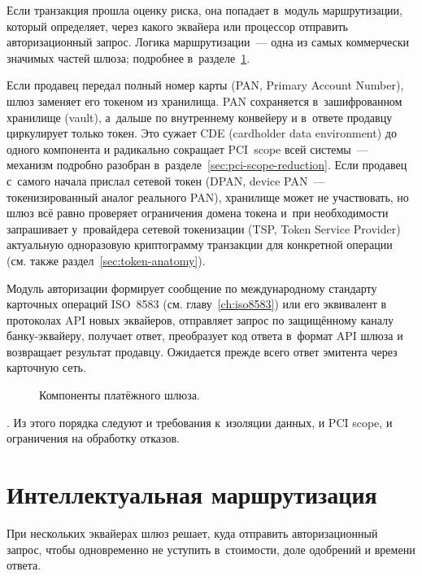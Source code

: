 Если транзакция прошла оценку риска, она попадает в~модуль
маршрутизации, который определяет, через какого эквайера
или процессор отправить авторизационный запрос.
Логика маршрутизации~--- одна из самых коммерчески
значимых частей шлюза; подробнее в~разделе~\ref{sec:gw-routing}.

Если продавец передал полный номер карты (PAN, Primary Account Number),
шлюз заменяет его токеном из хранилища. PAN сохраняется
в~зашифрованном хранилище (vault), а~дальше по внутреннему конвейеру
и в~ответе продавцу циркулирует только токен. Это сужает CDE
(cardholder data environment) до одного компонента и радикально
сокращает PCI~scope всей системы~--- механизм подробно разобран
в~разделе~\ref{sec:pci-scope-reduction}. Если продавец с~самого начала
прислал сетевой токен (DPAN, device PAN~--- токенизированный
аналог реального PAN), хранилище может не участвовать, но шлюз
всё равно проверяет ограничения домена токена и~при необходимости
запрашивает у~провайдера сетевой токенизации (TSP, Token Service
Provider) актуальную одноразовую криптограмму транзакции
для конкретной операции~\cite{emvco-payment-tokenisation-guide}
(см. также раздел~\ref{sec:token-anatomy}).

Модуль авторизации формирует сообщение по международному стандарту
карточных операций ISO~8583 (см. главу~\ref{ch:iso8583}) или его
эквивалент в протоколах API новых эквайеров, отправляет запрос
по защищённому каналу банку-эквайеру, получает ответ, преобразует
код ответа в~формат API шлюза и возвращает результат продавцу.
Ожидается прежде всего ответ эмитента через карточную сеть.

\begin{figure}[tbp]
  \centering
  \caption{Компоненты платёжного шлюза.}\label{fig:gateway-components}
\end{figure}

.
Из этого порядка следуют и требования к~изоляции данных, и PCI scope,
и ограничения на обработку отказов.

\section{Интеллектуальная маршрутизация}\label{sec:gw-routing}

При нескольких эквайерах шлюз решает, куда
отправить авторизационный запрос, чтобы одновременно
не уступить в~стоимости, доле одобрений и времени ответа.

